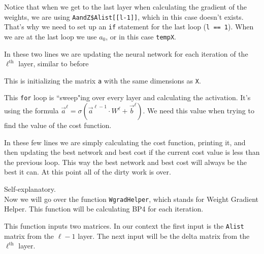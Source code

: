 \documentclass[12pt,letterpaper]{article}
\begin{document}
\begin{enumerate}


Notice that when we get to the last layer when calculating the gradient of the weights, we are using \texttt{AandZ\$Alist[[l-1]]}, which in this case doesn't exists. That's why we need to set up an \texttt{if} statement for the last loop (\texttt{l == 1}). When we are at the last loop we use $a_0$, or in this case \texttt{tempX}.



In these two lines we are updating the neural network for each iteration of the $\ell^{\text{th}}$ layer, similar to before



This is initializing the matrix \texttt{a} with the same dimensions as \texttt{X}.



This \texttt{for} loop is ``sweep"ing over every layer and calculating the activation. It's using the formula $\vec{a}^{\ell}=\sigma\left(\vec{a}^{\ell-1}\cdot W^{\ell}+\vec{b}^{\ell}\right)$. We need this value when trying to find the value of the cost function.



In these few lines we are simply calculating the cost function, printing it, and then updating the best network and best cost if the current cost value is less than the previous loop. This way the best network and best cost will always be the best it can. At this point all of the dirty work is over.



Self-explanatory.\\[2mm]
Now we will go over the function \texttt{WgradHelper}, which stands for Weight Gradient Helper. This function will be calculating BP4 for each iteration.



This function inputs two matrices. In our context the first input is the \texttt{Alist} matrix from the $\ell - 1$ layer. The next input will be the delta matrix from the $\ell^{\text{th}}$ layer.




\end{enumerate}
\end{document}
